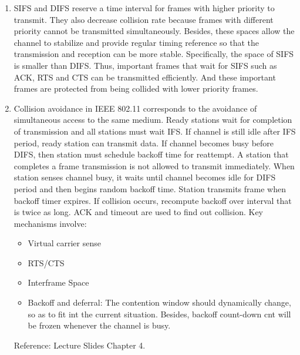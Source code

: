 \documentclass{article}
\begin{document}
\begin{enumerate}
\begin{enumerate}
        \item
        SIFS and DIFS reserve a time interval for frames with higher priority to transmit. They also decrease collision rate because frames with different priority cannot be transmitted simultaneously. 
        Besides, these spaces allow the channel to stabilize and provide regular timing reference so that the transmission and reception can be more stable.
        \newline Specifically, the space of SIFS is smaller than DIFS. Thus, important frames that wait for SIFS such as ACK, RTS and CTS can be transmitted efficiently. And these important frames are protected from being collided with lower priority frames.
        
        \item
        Collision avoidance in IEEE 802.11 corresponds to the avoidance of simultaneous access to the same medium. Ready stations wait for completion of transmission and all stations must wait IFS. If channel is still idle after IFS period, ready station can transmit data. If channel becomes busy before DIFS, then station must schedule backoff time for reattempt. A station that completes a frame transmission is not allowed to transmit immediately.
        \newline
        When station senses channel busy, it waits until channel becomes idle for DIFS period and then begins random backoff time. Station transmits frame when backoff timer expires. If collision occurs, recompute backoff over interval that is twice as long. ACK and timeout are used to find out collision.
        \newline Key mechanisms involve:
        \begin{itemize}
            \item Virtual carrier sense
            \item RTS/CTS
            \item Interframe Space
            \item Backoff and deferral: The contention window should dynamically change, so as to fit int the current situation. Besides, backoff count-down cnt will be frozen whenever the channel is busy.
        \end{itemize}
        
        Reference:
        Lecture Slides Chapter 4.
        
    \end{enumerate}
    

\end{enumerate}
\end{document}
